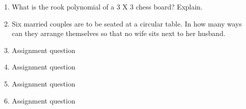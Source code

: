 \documentclass{article}
\begin{document}
\begin{enumerate}
 \item What is the rook polynomial of a 3 X 3 chess board? Explain.
 \item Six married couples are to be seated at a circular table. In how many ways can they arrange themselves so that no wife sits next to her husband.
 \item Assignment question

 \item Assignment question
 \item Assignment question
 \item Assignment question



	 

 
\end{enumerate}
  
 
\end{document}
